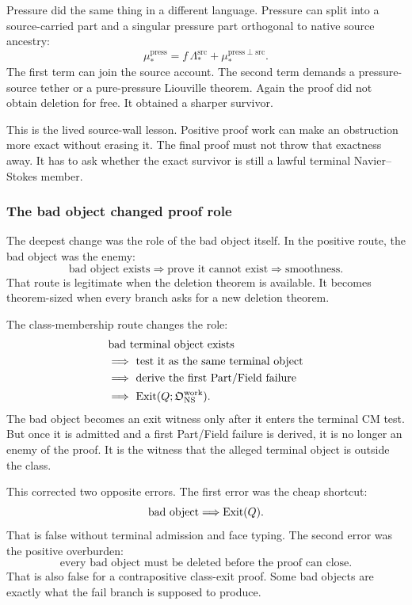Pressure did the same thing in a different language.
Pressure can split into a source-carried part and a singular pressure part
orthogonal to native source ancestry:
\[
  \mu_*^{\mathrm{press}}
  =
  f\,\Lambda_*^{\mathrm{src}}
  +
  \mu_*^{\mathrm{press}\perp\mathrm{src}}.
\]
The first term can join the source account.
The second term demands a pressure-source tether or a pure-pressure Liouville
theorem.
Again the proof did not obtain deletion for free.
It obtained a sharper survivor.

This is the lived source-wall lesson.
Positive proof work can make an obstruction more exact without erasing it.
The final proof must not throw that exactness away.
It has to ask whether the exact survivor is still a lawful terminal
Navier--Stokes member.

\subsubsection{The bad object changed proof role}

The deepest change was the role of the bad object itself.
In the positive route, the bad object was the enemy:
\[
  \text{bad object exists}
  \Longrightarrow
  \text{prove it cannot exist}
  \Longrightarrow
  \text{smoothness}.
\]
That route is legitimate when the deletion theorem is available.
It becomes theorem-sized when every branch asks for a new deletion theorem.

The class-membership route changes the role:
\[
\begin{aligned}
&\text{bad terminal object exists}\\
&\Longrightarrow\ \text{test it as the same terminal object}\\
&\Longrightarrow\ \text{derive the first Part/Field failure}\\
&\Longrightarrow\ \mathrm{Exit}(Q;\mathfrak O_{\mathrm{NS}}^{\mathrm{work}}).
\end{aligned}
\]
The bad object becomes an exit witness only after it enters the terminal CM
test.
But once it is admitted and a first Part/Field failure is derived, it is no longer an
enemy of the proof.
It is the witness that the alleged terminal object is outside the class.

This corrected two opposite errors.
The first error was the cheap shortcut:
\[
  \text{bad object}\Longrightarrow\mathrm{Exit}(Q).
\]
That is false without terminal admission and face typing.
The second error was the positive overburden:
\[
  \text{every bad object must be deleted before the proof can close.}
\]
That is also false for a contrapositive class-exit proof.
Some bad objects are exactly what the fail branch is supposed to produce.

